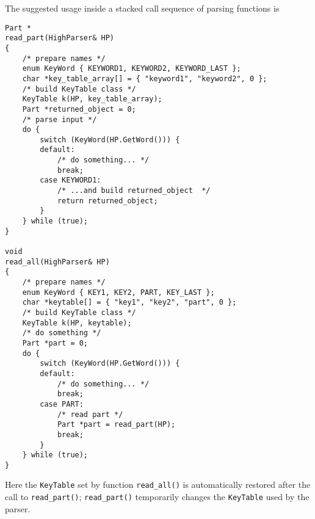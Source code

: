 \documentclass[10pt,dvips,fleqn,subeqn]{report}
\begin{document}
The suggested usage inside a stacked call sequence of parsing functions is
\begin{verbatim}
Part *
read_part(HighParser& HP)
{
    /* prepare names */
    enum KeyWord { KEYWORD1, KEYWORD2, KEYWORD_LAST };
    char *key_table_array[] = { "keyword1", "keyword2", 0 };
    /* build KeyTable class */
    KeyTable k(HP, key_table_array);
    Part *returned_object = 0;
    /* parse input */
    do {
        switch (KeyWord(HP.GetWord())) {
        default:
            /* do something... */
            break;
        case KEYWORD1:
            /* ...and build returned_object  */
            return returned_object;
        }
    } while (true);
}

void
read_all(HighParser& HP)
{
    /* prepare names */
    enum KeyWord { KEY1, KEY2, PART, KEY_LAST };
    char *keytable[] = { "key1", "key2", "part", 0 };
    /* build KeyTable class */
    KeyTable k(HP, keytable);
    /* do something */
    Part *part = 0;
    do {
        switch (KeyWord(HP.GetWord())) {
        default:
            /* do something... */
            break;
        case PART:
            /* read part */
            Part *part = read_part(HP);
            break;
        }
    } while (true);
}

\end{verbatim}
Here the \texttt{KeyTable} set by function \texttt{read\_all()} 
is automatically restored after the call to \texttt{read\_part()}; 
\texttt{read\_part()} temporarily changes the \texttt{KeyTable}
used by the parser.
\end{document}
